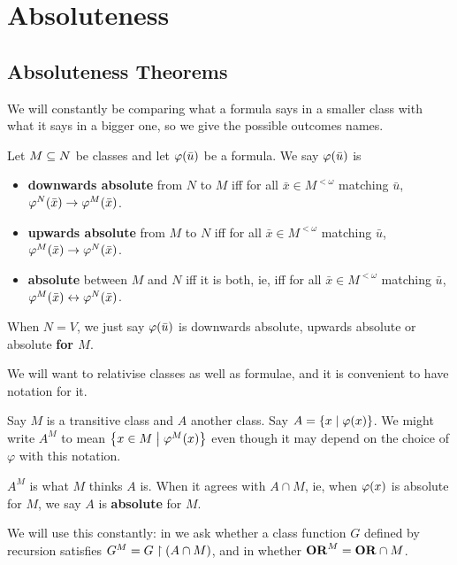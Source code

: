 \section{Absoluteness} \label{Ch3:Sec:Absoluteness}

\subsection{Absoluteness Theorems}

We will constantly be comparing what a formula says in a smaller class with what it says in a bigger one, so we give the possible outcomes names.

\begin{boxdefinition}[Absoluteness]
    Let $M \subseteq N$ be classes and let $\varphi\!\left( \bar{u} \right)$ be a formula. We say $\varphi\!\left( \bar{u} \right)$ is
    \begin{itemize}
        \item \textbf{downwards absolute} from $N$ to $M$ iff for all $\bar{x} \in M^{<\omega}$ matching $\bar{u}$, $\varphi^N\!\left( \bar{x} \right) \to \varphi^M\!\left( \bar{x} \right)$.
        \item \textbf{upwards absolute} from $M$ to $N$ iff for all $\bar{x} \in M^{<\omega}$ matching $\bar{u}$, $\varphi^M\!\left( \bar{x} \right) \to \varphi^N\!\left( \bar{x} \right)$.
        \item \textbf{absolute} between $M$ and $N$ iff it is both, ie, iff for all $\bar{x} \in M^{<\omega}$ matching $\bar{u}$, $\varphi^M\!\left( \bar{x} \right) \leftrightarrow \varphi^N\!\left( \bar{x} \right)$.
    \end{itemize}
    When $N = V$, we just say $\varphi\!\left( \bar{u} \right)$ is downwards absolute, upwards absolute or absolute \textbf{for $M$}.
\end{boxdefinition}

We will want to relativise classes as well as formulae, and it is convenient to have notation for it.

\begin{boxnotation}
    Say $M$ is a transitive class and $A$ another class. Say $A = \left\{ x \; \middle\vert \; \varphi(x) \right\}$. We might write $A^M$ to mean $\left\{ x \in M \; \middle\vert \; \varphi^M(x) \right\}$ even though it may depend on the choice of $\varphi$ with this notation.

    $A^M$ is what $M$ thinks $A$ is. When it agrees with $A \cap M$, ie, when $\varphi(x)$ is absolute for $M$, we say $A$ is \textbf{absolute} for $M$.
\end{boxnotation}

We will use this constantly: in  we ask whether a class function $G$ defined by recursion satisfies $G^M = G \restriction \left( A \cap M \right)$, and in  whether $\mathbf{OR}^M = \mathbf{OR} \cap M$.


